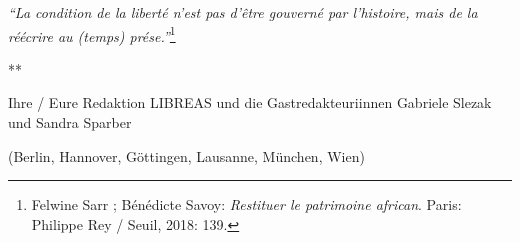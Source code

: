 \documentclass[a4paper,
fontsize=11pt,
oneside,
numbers=noperiodatend,
parskip=half-,
bibliography=totoc,
final
]{scrartcl}
\begin{document}
\emph{\enquote{La condition de la liberté n'est pas d'être gouverné par
l'histoire, mais de la réécrire au (temps) prése.}}\footnote{Felwine
  Sarr ; Bénédicte Savoy: \emph{Restituer le patrimoine african}. Paris:
  Philippe Rey / Seuil, 2018: 139.}

{\par \centering ***\par}

Ihre / Eure Redaktion LIBREAS und die Gastredakteuriinnen Gabriele
Slezak und Sandra Sparber

(Berlin, Hannover, Göttingen, Lausanne, München, Wien)

\end{document}
